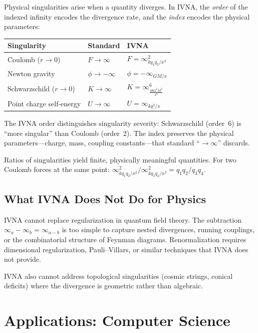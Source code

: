 \documentclass[12pt]{article}
\theoremstyle{definition}
\theoremstyle{remark}
\newcommand{\vi}[1]{\infty_{#1}}        %
\newcommand{\vin}[2]{\infty^{#1}_{#2}}  %
\begin{document}
Physical singularities arise when a quantity diverges. In IVNA, the
\emph{order} of the indexed infinity encodes the divergence rate,
and the \emph{index} encodes the physical parameters:

\begin{center}
\begin{tabular}{lll}
\toprule
\textbf{Singularity} & \textbf{Standard} & \textbf{IVNA} \\
\midrule
Coulomb ($r \to 0$) & $F \to \infty$ & $F = \vin{2}{kq_1q_2/x^2}$ \\
Newton gravity & $\phi \to -\infty$ & $\phi = -\vi{GM/x}$ \\
Schwarzschild ($r \to 0$) & $K \to \infty$ & $K = \vin{6}{\frac{48G^2M^2}{x^6}}$ \\
Point charge self-energy & $U \to \infty$ & $U = \vi{kq^2/x}$ \\
\bottomrule
\end{tabular}
\end{center}

The IVNA order distinguishes singularity severity: Schwarzschild
(order~6) is ``more singular'' than Coulomb (order~2). The index
preserves the physical parameters---charge, mass, coupling constants---that
standard ``$\to \infty$'' discards.

Ratios of singularities yield finite, physically meaningful quantities.
For two Coulomb forces at the same point:
$\vin{2}{kq_1q_2/x^2} / \vin{2}{kq_3q_4/x^2} = q_1q_2 / q_3q_4$.

\subsection{What IVNA Does Not Do for Physics}

IVNA cannot replace regularization in quantum field theory. The
subtraction $\vi{a} - \vi{b} = \vi{a-b}$ is too simple to capture
nested divergences, running couplings, or the combinatorial structure
of Feynman diagrams. Renormalization requires dimensional regularization,
Pauli--Villars, or similar techniques that IVNA does not provide.

IVNA also cannot address topological singularities (cosmic strings,
conical deficits) where the divergence is geometric rather than
algebraic.


\section{Applications: Computer Science}
\label{sec:cs}
\end{document}
